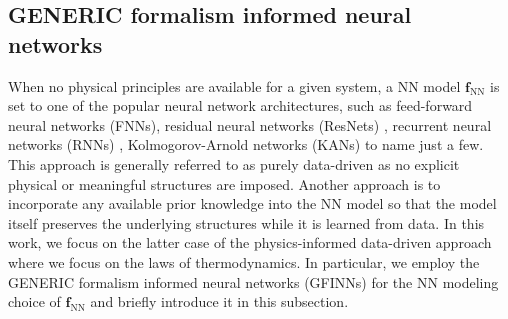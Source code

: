 \documentclass[final]{siamltex}
\newcommand{\jrp}[1]{{\color{orange}{#1}}}
\newcommand{\bfa}[1]{\boldsymbol{#1}}
\begin{document}




\subsection{GENERIC formalism informed neural networks}
\label{sec:GFINNs}
When no physical principles are available for a given system, a NN model $\bfa{f}_\text{NN}$ is set to one of the popular neural network architectures, such as feed-forward neural networks (FNNs), residual neural networks (ResNets) \cite{he2016deep}, recurrent neural networks (RNNs) \cite{pearlmutter1989learning,rumelhart1985learning}, Kolmogorov-Arnold networks (KANs) \cite{liu2024kan} to name just a few.
This approach is generally referred to as purely data-driven as no explicit physical or meaningful structures are imposed. 
Another approach is to incorporate any available prior knowledge into the NN model so that the model itself preserves the underlying structures while it is learned from data.
In this work, we focus on the latter case of the physics-informed data-driven approach where we focus on the laws of thermodynamics. In particular, we employ the GENERIC formalism informed neural networks (GFINNs) \cite{zhang2022gfinns,park2024tlasdi} for the NN modeling choice of $\bfa{f}_\text{NN}$ and briefly introduce it in this subsection.
\end{document}
